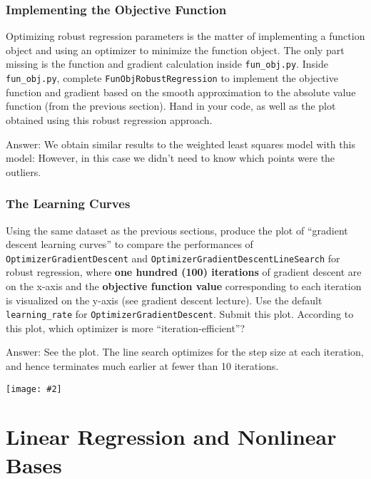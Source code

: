\documentclass{article}
\def\ans#1{\par\gre{Answer: #1}}
\def\answer#1{\ans{#1}}
\def\blu#1{{\color{blu}#1}}
\def\gre#1{{\color{gre}#1}}
\def\red#1{{\color{red}#1}}
\newcommand{\centerfig}[2]{\begin{center}\texttt{[image: \#2]}\end{center}}
\begin{document}
\subsubsection{Implementing the Objective Function}

Optimizing robust regression parameters is the matter of implementing a function object and using an optimizer to minimize the function object. The only part missing is the function and gradient calculation inside \texttt{fun\_obj.py}.
\blu{Inside \texttt{fun\_obj.py}, complete \texttt{FunObjRobustRegression} to implement the objective function and gradient based on the smooth
approximation to the absolute value function (from the previous section). Hand in your code, as well
as the plot obtained using this robust regression approach.}


\answer{
We obtain similar results to the weighted least squares model with this model:
However, in this case we didn't need to know which points were the outliers.
}

\subsubsection{The Learning Curves}

\blu{
	Using the same dataset as the previous sections, produce the plot of ``gradient descent learning curves'' to compare the performances of \texttt{OptimizerGradientDescent} and \texttt{OptimizerGradientDescentLineSearch} for robust regression, where \textbf{one hundred (100) iterations} of gradient descent are on the x-axis and the \red{\textbf{objective function value}} corresponding to each iteration is visualized on the y-axis (see gradient descent lecture). Use the default \texttt{learning\_rate} for \texttt{OptimizerGradientDescent}. Submit this plot. According to this plot, which optimizer is more ``iteration-efficient''?
} 

\ans{
	See the plot. The line search optimizes for the step size at each iteration, and hence terminates much earlier at fewer than 10 iterations.
	\centerfig{.7}{../figs/learning_curves_robust_regression.pdf}
}

\section{Linear Regression and Nonlinear Bases}
\end{document}
